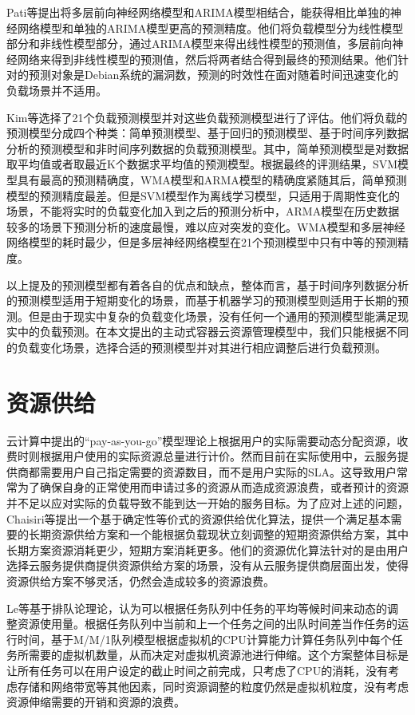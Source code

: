 Pati等提出将多层前向神经网络模型和ARIMA模型相结合，能获得相比单独的神经网络模型和单独的ARIMA模型更高的预测精度\cite{pati2014comparison}。他们将负载模型分为线性模型部分和非线性模型部分，通过ARIMA模型来得出线性模型的预测值，多层前向神经网络来得到非线性模型的预测值，然后将两者结合得到最终的预测结果。他们针对的预测对象是Debian系统的漏洞数，预测的时效性在面对随着时间迅速变化的负载场景并不适用。

Kim等选择了21个负载预测模型并对这些负载预测模型进行了评估\cite{kim2016empirical}。他们将负载的预测模型分成四个种类：简单预测模型、基于回归的预测模型、基于时间序列数据分析的预测模型和非时间序列数据的负载预测模型。其中，简单预测模型是对数据取平均值或者取最近K个数据求平均值的预测模型。根据最终的评测结果，SVM模型具有最高的预测精确度，WMA模型和ARMA模型的精确度紧随其后，简单预测模型的预测精度最差。但是SVM模型作为离线学习模型，只适用于周期性变化的场景，不能将实时的负载变化加入到之后的预测分析中，ARMA模型在历史数据较多的场景下预测分析的速度最慢，难以应对突发的变化。WMA模型和多层神经网络模型的耗时最少，但是多层神经网络模型在21个预测模型中只有中等的预测精度。

以上提及的预测模型都有着各自的优点和缺点，整体而言，基于时间序列数据分析的预测模型适用于短期变化的场景，而基于机器学习的预测模型则适用于长期的预测。但是由于现实中复杂的负载变化场景，没有任何一个通用的预测模型能满足现实中的负载预测。在本文提出的主动式容器云资源管理模型中，我们只能根据不同的负载变化场景，选择合适的预测模型并对其进行相应调整后进行负载预测。

\section{资源供给}
云计算中提出的“pay-as-you-go”模型理论上根据用户的实际需要动态分配资源，收费时则根据用户使用的实际资源总量进行计价\cite{armbrust2010view}。然而目前在实际使用中，云服务提供商都需要用户自己指定需要的资源数目，而不是用户实际的SLA\cite{patel2009service}。这导致用户常常为了确保自身的正常使用而申请过多的资源从而造成资源浪费，或者预计的资源并不足以应对实际的负载导致不能到达一开始的服务目标。为了应对上述的问题，Chaisiri等提出一个基于确定性等价式的资源供给优化算法，提供一个满足基本需要的长期资源供给方案和一个能根据负载现状立刻调整的短期资源供给方案，其中长期方案资源消耗更少，短期方案消耗更多\cite{chaisiri2012optimization}。他们的资源优化算法针对的是由用户选择云服务提供商提供资源供给方案的场景，没有从云服务提供商层面出发，使得资源供给方案不够灵活，仍然会造成较多的资源浪费。

Le等基于排队论理论，认为可以根据任务队列中任务的平均等候时间来动态的调整资源使用量\cite{le2013dynamic}。根据任务队列中当前和上一个任务之间的出队时间差当作任务的运行时间，基于M/M/1队列模型根据虚拟机的CPU计算能力计算任务队列中每个任务所需要的虚拟机数量，从而决定对虚拟机资源池进行伸缩。这个方案整体目标是让所有任务可以在用户设定的截止时间之前完成，只考虑了CPU的消耗，没有考虑存储和网络带宽等其他因素，同时资源调整的粒度仍然是虚拟机粒度，没有考虑资源伸缩需要的开销和资源的浪费。

